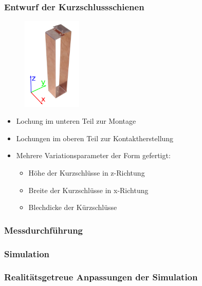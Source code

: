 \documentclass[accentcolor=tud9b, colorbacktitle, inverttitle]{tudbeamer}
\begin{document}
\begin{frame}\frametitle{Entwurf der Kurzschlussschienen}
\begin{multicols}{2}
\vspace{-2em}
	\begin{figure}[h]
		\centering
		\includegraphics[width=0.25\textwidth]{KS}
	\end{figure}
	\vfill\null
	\columnbreak
	\begin{itemize}
		\item Lochung im unteren Teil zur Montage
		\item Lochungen im oberen Teil zur Kontaktherstellung
		\item Mehrere Variationsparameter der Form gefertigt:
		\begin{itemize}
			\item H\"ohe der Kurzschl\"usse in z-Richtung
			\item Breite der Kurzschl\"usse in x-Richtung
			\item Blechdicke der K\"urzschl\"usse
		\end{itemize}
	\end{itemize}
\end{multicols}
\end{frame}




\begin{frame}\frametitle{Messdurchf\"uhrung}

\end{frame}






\begin{frame}\frametitle{Simulation}

\end{frame}


\begin{frame}\frametitle{Realit\"atsgetreue Anpassungen der Simulation}

\end{frame}
\end{document}
